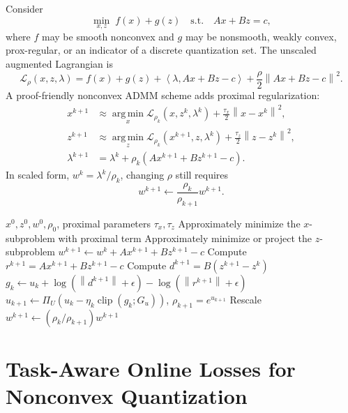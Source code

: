 \documentclass[11pt]{article}
\newcommand{\argmin}{\operatorname*{arg\,min}}
\newcommand{\clip}{\operatorname{clip}}
\newcommand{\norm}[1]{\left\lVert #1 \right\rVert}
\newcommand{\ip}[2]{\left\langle #1,#2 \right\rangle}
\newcommand{\Lagr}{\mathcal{L}}
\begin{document}
Consider
\begin{equation}
    \min_{x,z}\; f(x)+g(z)
    \quad \text{s.t.}\quad
    Ax+Bz=c,
    \label{eq:generic-nonconvex}
\end{equation}
where \(f\) may be smooth nonconvex and \(g\) may be nonsmooth, weakly convex,
prox-regular, or an indicator of a discrete quantization set.  The unscaled
augmented Lagrangian is
\begin{equation}
    \Lagr_{\rho}(x,z,\lambda)
    =
    f(x)+g(z)+\ip{\lambda}{Ax+Bz-c}
    +\frac{\rho}{2}\norm{Ax+Bz-c}^2.
\end{equation}
A proof-friendly nonconvex ADMM scheme adds proximal regularization:
\begin{align}
    x^{k+1}
    &\approx
    \argmin_x
    \Lagr_{\rho_k}(x,z^k,\lambda^k)
    +\frac{\tau_x}{2}\norm{x-x^k}^2,\\
    z^{k+1}
    &\approx
    \argmin_z
    \Lagr_{\rho_k}(x^{k+1},z,\lambda^k)
    +\frac{\tau_z}{2}\norm{z-z^k}^2,\\
    \lambda^{k+1}
    &=
    \lambda^k+\rho_k(Ax^{k+1}+Bz^{k+1}-c).
\end{align}
In scaled form, \(w^k=\lambda^k/\rho_k\), changing \(\rho\) still requires
\begin{equation}
    w^{k+1}\leftarrow \frac{\rho_k}{\rho_{k+1}}w^{k+1}.
    \label{eq:nonconvex-rescale}
\end{equation}

\begin{algorithm}[t]
\caption{Nonconvex online ADMM with bounded log-penalty path}
\label{alg:nonconvex-online-admm}
\begin{algorithmic}[1]
\Require \(x^0,z^0,w^0,\rho_0\), proximal parameters \(\tau_x,\tau_z\)
    \State Approximately minimize the \(x\)-subproblem with proximal term
    \State Approximately minimize or project the \(z\)-subproblem
    \State \(w^{k+1}\gets w^k+Ax^{k+1}+Bz^{k+1}-c\)
    \State Compute \(r^{k+1}=Ax^{k+1}+Bz^{k+1}-c\)
    \State Compute \(d^{k+1}=B(z^{k+1}-z^k)\)
    \State \(g_k\gets u_k+\log(\norm{d^{k+1}}+\epsilon)
           -\log(\norm{r^{k+1}}+\epsilon)\)
    \State \(u_{k+1}\gets
           \Pi_U(u_k-\eta_k\clip(g_k;G_u))\), \(\rho_{k+1}=e^{u_{k+1}}\)
        \State Rescale \(w^{k+1}\gets(\rho_k/\rho_{k+1})w^{k+1}\)
    \EndIf
\EndFor
\end{algorithmic}
\end{algorithm}

\section{Task-Aware Online Losses for Nonconvex Quantization}
\end{document}
